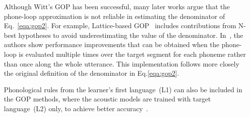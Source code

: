 Although Witt's GOP has been successful, many later works argue that the phone-loop approximation is not reliable in estimating the denominator of Eq.~\ref{eqa:gop2}.
For example, Lattice-based GOP~\cite{Song2010LatticebasedGI} includes contributions from N-best hypotheses to avoid underestimating the value of the denominator.
In~\cite{luo2009analysis}, the authors show performance improvements that can be obtained when the phone-loop is evaluated multiple times over the target segment for each phoneme  rather than once along the whole utterance.
This implementation follows more closely the original definition of the denominator in Eq.\ref{eqa:gop2}.

Phonological rules from the learner's first language~(L1) can also be included in the GOP methods, where the acoustic models are trained with target language~(L2) only, to achieve better accuracy~\cite{ERN, DUDY201862}.

